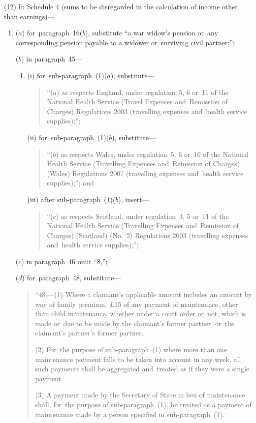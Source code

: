 \documentclass[12pt,a4paper]{article}
\begin{document}
(12) In Schedule 4 (sums to be disregarded in the calculation of income other than earnings)—
\begin{enumerate}\item[]
($a$) for~paragraph~16($b$), substitute “a war widow’s pension or~any corresponding pension payable to a widower or~surviving civil partner;”;

($b$) in paragraph~45—
\begin{enumerate}\item[]
(i) for~sub-paragraph~(1)($a$), substitute—
\begin{quotation}
“($a$) as respects England, under regulation~5, 6 or~11 of the National Health Service (Travel Expenses and~Remission of Charges) Regulations 2003 (travelling expenses and~health service supplies);”;
\end{quotation}

(ii) for~sub-paragraph~(1)($b$), substitute—
\begin{quotation}
“($b$) as respects Wales, under regulation~5, 6 or~10 of the National Health Service (Travelling Expenses and~Remission of Charges) (Wales) Regulations 2007 (travelling expenses and~health service supplies);”; and
\end{quotation}

(iii) after sub-paragraph~(1)($b$), insert—
\begin{quotation}
“($c$) as respects Scotland, under regulation~3, 5 or~11 of the National Health Service (Travelling Expenses and~Remission of Charges) (Scotland) (No.~2) Regulations 2003 (travelling expenses and~health service supplies);”;
\end{quotation}
\end{enumerate}

($c$) in paragraph~46 omit “8,”;

($d$) for~paragraph~48, substitute—
\begin{quotation}
“48.---(1)  Where a claimant’s applicable amount includes an amount by way of family premium, £15 of any payment of maintenance, other than child maintenance, whether under a court order or~not, which is made or~due to be made by the claimant’s former partner, or~the claimant’s partner’s former partner.

(2) For~the purpose of sub-paragraph~(1) where more than one maintenance payment falls to be taken into account in any week, all such payments shall be aggregated and~treated as if they were a single payment.

(3) A payment made by the Secretary of State in lieu of maintenance shall, for~the purpose of sub-paragraph~(1), be treated as a payment of maintenance made by a person specified in sub-paragraph~(1).


\end{quotation}
\end{enumerate}
\end{document}

